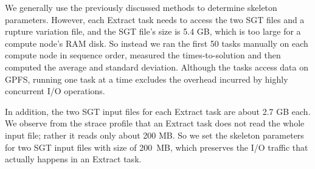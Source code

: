 \documentclass[preprint,12pt]{elsarticle}
\newcommand{\katznote}[1]{ {\textcolor{blue}    { ***Dan:   #1 }}}
\newcommand{\zhaonote}[1]{{\textcolor{darkgreen}{ ***Zhao:  #1 }}}
\newcommand{\katznote}[1]{}
\newcommand{\zhaonote}[1]{}
\begin{document}


We generally use the previously discussed methods to determine skeleton parameters.
However, each Extract task needs to access the two SGT files and a rupture variation file, and the SGT file's size is 5.4 GB, which is too large for a compute node's RAM disk.
So instead we ran the first 50 tasks manually on each compute node in sequence order, measured the times-to-solution and 
then computed the average and standard deviation. 
Although the tasks access data on GPFS, running one task at a time excludes the overhead  incurred  by highly concurrent I/O operations. 

In addition, the two SGT input files for each Extract task are about 2.7 GB each. %
We observe from the strace profile that
an Extract task does not read the whole input file; rather it reads only  about 200 MB. So we %
set the skeleton parameters for two SGT input
files with  size of 200~MB, which %
preserves the I/O traffic that actually happens
in an Extract task. 
\end{document}
